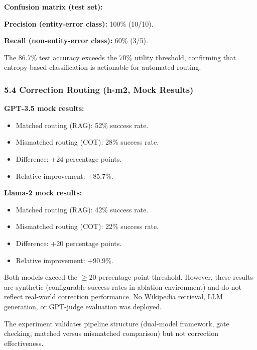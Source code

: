 \textbf{Confusion matrix (test set):}

\begin{table}[htbp]
\centering
{}
\end{table}

\textbf{Precision (entity-error class):} 100\% (10/10).

\textbf{Recall (non-entity-error class):} 60\% (3/5).

The 86.7\% test accuracy exceeds the 70\% utility threshold, confirming that entropy-based classification is actionable for automated routing.

\subsubsection{5.4 Correction Routing (h-m2, Mock Results)}

\textbf{GPT-3.5 mock results:}

\begin{itemize}
\item Matched routing (RAG): 52\% success rate.
\item Mismatched routing (COT): 28\% success rate.
\item Difference: +24 percentage points.
\item Relative improvement: +85.7\%.
\end{itemize}

\textbf{Llama-2 mock results:}

\begin{itemize}
\item Matched routing (RAG): 42\% success rate.
\item Mismatched routing (COT): 22\% success rate.
\item Difference: +20 percentage points.
\item Relative improvement: +90.9\%.
\end{itemize}

Both models exceed the $\geq 20$ percentage point threshold. However, these results are synthetic (configurable success rates in ablation environment) and do not reflect real-world correction performance. No Wikipedia retrieval, LLM generation, or GPT-judge evaluation was deployed.

The experiment validates pipeline structure (dual-model framework, gate checking, matched versus mismatched comparison) but not correction effectiveness.
